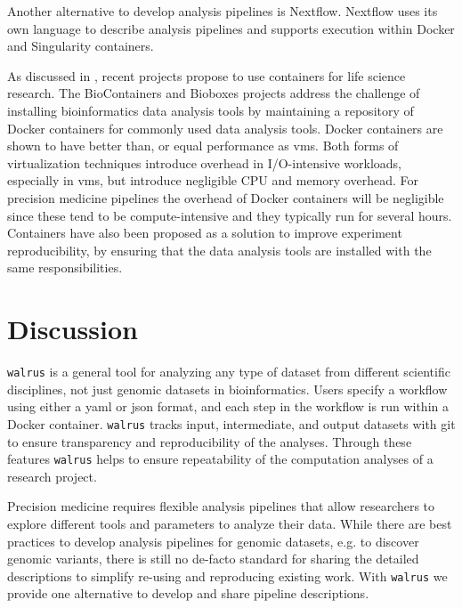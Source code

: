 Another alternative to develop analysis pipelines is
Nextflow.\cite{di2017nextflow} Nextflow uses its own language to describe
analysis pipelines and supports execution within Docker and Singularity
containers. 

As discussed in \cite{NIK, fjukstad2017review}, recent projects propose to use
containers for life science research. The BioContainers and
Bioboxes\cite{belmann2015bioboxes} projects address the challenge of installing
bioinformatics data analysis tools by maintaining a repository of Docker
containers for commonly used data analysis tools. Docker containers are shown to
have better than, or equal performance as \glspl{vm}.\cite{di2015impact} Both
forms of virtualization techniques introduce overhead in I/O-intensive
workloads, especially in \glspl{vm}, but introduce negligible CPU and memory
overhead. For precision medicine pipelines the overhead of Docker containers
will be negligible since these tend to be compute-intensive and they typically
run for several hours.\cite{di2015impact} Containers have also been proposed as
a solution to improve experiment reproducibility, by ensuring that the data
analysis tools are installed with the same
responsibilities.\cite{boettiger2015introduction} 



\section{Discussion}
\texttt{walrus} is a general tool for analyzing any type of dataset from
different scientific disciplines, not just genomic datasets in bioinformatics.
Users specify a workflow using either a \gls{yaml} or \gls{json} format, and
each step in the workflow is run within a Docker container. \texttt{walrus}
tracks input, intermediate, and output datasets with git to ensure transparency
and reproducibility of the analyses. Through these features \texttt{walrus}
helps to ensure repeatability of the computation analyses of a research project. 

Precision medicine requires flexible analysis pipelines that allow researchers
to explore different tools and parameters to analyze their data.  While there
are best practices to develop analysis pipelines for genomic datasets, e.g. to
discover genomic variants, there is still no de-facto standard for sharing the
detailed descriptions to simplify re-using and reproducing existing work. With
\texttt{walrus} we provide one alternative to develop and share pipeline
descriptions.  

